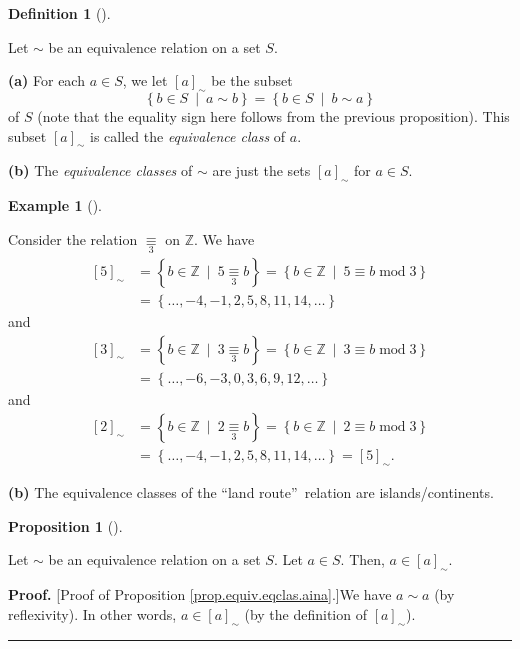 \documentclass[numbers=enddot,12pt,final,onecolumn,notitlepage]{scrartcl}%
\numberwithin{exer}{subsection}
\theoremstyle{definition}
\newtheorem{prop}[theo]{Proposition}
\newenvironment{proposition}[1][]
{\begin{prop}[#1]\begin{leftbar}}
{\end{leftbar}\end{prop}}
\newtheorem{defi}[theo]{Definition}
\newenvironment{definition}[1][]
{\begin{defi}[#1]\begin{leftbar}}
{\end{leftbar}\end{defi}}
\newtheorem{exam}[theo]{Example}
\newenvironment{example}[1][]
{\begin{exam}[#1]\begin{leftbar}}
{\end{leftbar}\end{exam}}
\newenvironment{proof}[1][Proof]{\noindent\textbf{#1.} }{\ \rule{0.5em}{0.5em}}
\begin{document}
\begin{definition}
Let $\sim$ be an equivalence relation on a set $S$.

\textbf{(a)} For each $a\in S$, we let $\left[  a\right]  _{\sim}$ be the
subset
\[
\left\{  b\in S\ \mid\ a\sim b\right\}  =\left\{  b\in S\ \mid\ b\sim
a\right\}
\]
of $S$ (note that the equality sign here follows from the previous
proposition). This subset $\left[  a\right]  _{\sim}$ is called the
\textit{equivalence class} of $a$.

\textbf{(b)} The \textit{equivalence classes} of $\sim$ are just the sets
$\left[  a\right]  _{\sim}$ for $a\in S$.
\end{definition}

\begin{example}
Consider the relation $\underset{3}{\equiv}$ on $\mathbb{Z}$. We have%
\begin{align*}
\left[  5\right]  _{\sim}  &  =\left\{  b\in\mathbb{Z}\ \mid
\ 5\underset{3}{\equiv}b\right\}  =\left\{  b\in\mathbb{Z}\ \mid\ 5\equiv
b\operatorname{mod}3\right\} \\
&  =\left\{  \ldots,-4,-1,2,5,8,11,14,\ldots\right\}
\end{align*}
and%
\begin{align*}
\left[  3\right]  _{\sim}  &  =\left\{  b\in\mathbb{Z}\ \mid
\ 3\underset{3}{\equiv}b\right\}  =\left\{  b\in\mathbb{Z}\ \mid\ 3\equiv
b\operatorname{mod}3\right\} \\
&  =\left\{  \ldots,-6,-3,0,3,6,9,12,\ldots\right\}
\end{align*}
and%
\begin{align*}
\left[  2\right]  _{\sim}  &  =\left\{  b\in\mathbb{Z}\ \mid
\ 2\underset{3}{\equiv}b\right\}  =\left\{  b\in\mathbb{Z}\ \mid\ 2\equiv
b\operatorname{mod}3\right\} \\
&  =\left\{  \ldots,-4,-1,2,5,8,11,14,\ldots\right\}  =\left[  5\right]
_{\sim}.
\end{align*}


\textbf{(b)} The equivalence classes of the \textquotedblleft land
route\textquotedblright\ relation are islands/continents.
\end{example}

\begin{proposition}
\label{prop.equiv.eqclas.aina}Let $\sim$ be an equivalence relation on a set
$S$. Let $a\in S$. Then, $a\in\left[  a\right]  _{\sim}$.
\end{proposition}

\begin{proof}
[Proof of Proposition \ref{prop.equiv.eqclas.aina}.]We have $a\sim a$ (by
reflexivity). In other words, $a\in\left[  a\right]  _{\sim}$ (by the
definition of $\left[  a\right]  _{\sim}$).
\end{proof}
\end{document}
